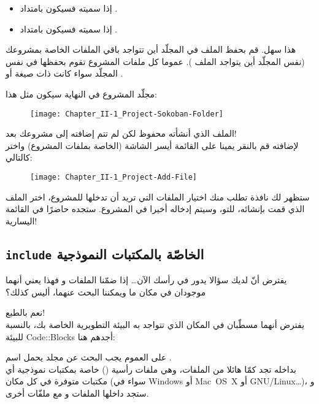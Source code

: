 \begin{itemize}
  \item إذا سميته
فسيكون بامتداد
.
  \item إذا سميته
فسيكون بامتداد
.
\end{itemize}

هذا سهل. قم بحفظ الملف في المجلّد أين تتواجد باقي الملفات الخاصة بمشروعك (نفس المجلّد أين يتواجد الملف
). عموما كل ملفات المشروع تقوم بحفظها في نفس المجلّد سواء كانت ذات صيغة
أو
.

مجلّد المشروع في النهاية سيكون مثل هذا:

\begin{figure}[H]
	\centering
	\texttt{[image: Chapter\_II-1\_Project-Sokoban-Folder]}
\end{figure}

الملف الذي أنشأته محفوظ لكن لم تتم إضافته إلى مشروعك بعد!\\
لإضافته قم بالنقر يمينا على القائمة أيسر الشاشة (الخاصة بملفات المشروع) واختر
كالتالي:

\begin{figure}[H]
	\centering
	\texttt{[image: Chapter\_II-1\_Project-Add-File]}
\end{figure}

ستظهر لك نافذة تطلب منك اختيار الملفات التي تريد أن تدخلها للمشروع، اختر الملف الذي قمت بإنشائه، للتو، وسيتم إدخاله أخيرا في المشروع.  ستجده حاضرًا في القائمة اليسارية!

\subsection{\texttt{include} الخاصّة بالمكتبات النموذجية}

يفترض أنّ لديك سؤالا يدور في رأسك الآن\dots
إذا ضمّنا الملفات
و
فهذا يعني أنهما موجودان في مكان ما ويمكننا البحث عنهما، أليس كذلك؟

نعم بالطبع!\\
يفترض أنهما مسطّبان في المكان الذي تتواجد به البيئة التطويرية الخاصة بك، بالنسبة للبيئة
\textenglish{Code::Blocks}
أجدهم هنا:


على العموم يجب البحث عن مجلد يحمل اسم
.\\
بداخله تجد كمّا هائلا من الملفات، وهي ملفات رأسية
()
خاصة بمكتبات نموذجية أي مكتبات متوفرة في كل مكان (سواء في 
\textenglish{Windows}
أو
\textenglish{\mbox{Mac OS X}}
أو 
\textenglish{\mbox{GNU/Linux}}\dots)،
و ستجد داخلها الملفات
و
مع ملفّات أخرى.


